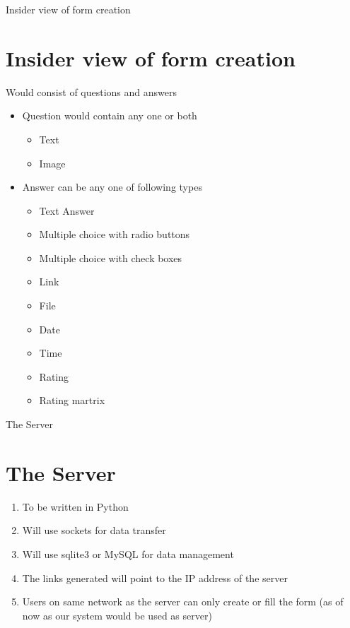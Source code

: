 \documentclass{beamer}
\begin{document}
    \begin{frame}{Insider view of form creation}
        \section{Insider view of form creation}
        Would consist of questions and answers\\
        \begin{itemize}
            \item Question would contain any one or both
            \begin{itemize}
                \item Text
                \item Image
            \end{itemize}

            \item Answer can be any one of following types
            \begin{itemize}
                \item Text Answer
                \item Multiple choice with radio buttons
                \item Multiple choice with check boxes
                \item Link
                \item File
                \item Date
                \item Time
                \item Rating
                \item Rating martrix
            \end{itemize}
        \end{itemize}
    \end{frame}

    \begin{frame}{The Server}
        \section{The Server}
        \begin{enumerate}
            \item To be written in Python
            \item Will use sockets for data transfer
            \item Will use sqlite3 or MySQL for data management
            \item The links generated will point to the IP address of the server
            \item Users on same network as the server can only create or fill the form (as of now as our system would be used as server)
        \end{enumerate}
        
    \end{frame}
\end{document}
